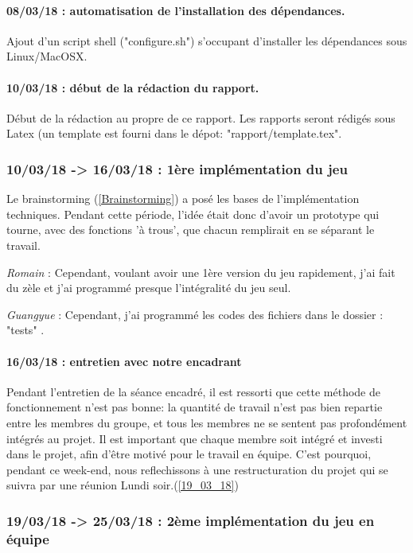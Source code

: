 \documentclass[10pt]{article}
\begin{document}
				\paragraph{08/03/18 : automatisation de l'installation des dépendances.}
					Ajout d'un script shell ("configure.sh") s'occupant d'installer les dépendances sous Linux/MacOSX.

				\paragraph{10/03/18 : début de la rédaction du rapport.}
					Début de la rédaction au propre de ce rapport.
					Les rapports seront rédigés sous Latex (un template est fourni dans le dépot: "rapport/template.tex".
					
			\subsubsection{10/03/18 -> 16/03/18 : 1ère implémentation du jeu}
				Le brainstorming (\ref{Brainstorming}) a posé les bases de l'implémentation techniques.\newline
				Pendant cette période, l'idée était donc d'avoir un prototype qui tourne,
				avec des fonctions 'à trous', que chacun remplirait en se séparant le travail.
				
				\textit{Romain} : Cependant, voulant avoir une 1ère version du jeu rapidement, j'ai fait du zèle
				et j'ai programmé presque l'intégralité du jeu seul.

				\textit{Guangyue} : Cependant, j'ai programmé les codes des fichiers dans le dossier : "tests" .
				
				\paragraph{16/03/18 : entretien avec notre encadrant}
					Pendant l'entretien de la séance encadré, il est ressorti que cette méthode de
					fonctionnement n'est pas bonne: la quantité de travail n'est pas bien repartie entre
					les membres du groupe, et tous les membres ne se sentent pas profondément intégrés au projet.
					Il est important que chaque membre soit intégré et investi dans le projet, afin d'être motivé pour le travail en équipe.
					C'est pourquoi, pendant ce week-end, nous reflechissons à une restructuration du projet qui se suivra par une réunion Lundi soir.(\ref{19_03_18})

			\subsubsection{19/03/18 -> 25/03/18 : 2ème implémentation du jeu en équipe}
\end{document}
